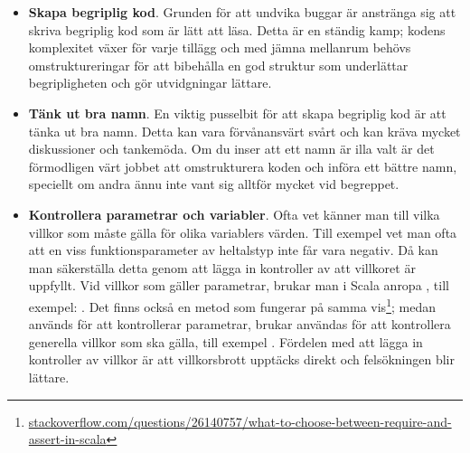 \begin{itemize}
\item \textbf{Skapa begriplig kod}. Grunden för att undvika buggar är anstränga sig att skriva begriplig kod som är lätt att läsa. Detta är en ständig kamp; kodens komplexitet växer för varje tillägg och med jämna mellanrum behövs omstruktureringar  för att bibehålla en god struktur som underlättar begripligheten och gör utvidgningar lättare. 

\item \textbf{Tänk ut bra namn}. En viktig pusselbit för att skapa begriplig kod är att tänka ut bra namn. Detta kan vara förvånansvärt svårt och kan kräva mycket diskussioner och tankemöda. 
Om du inser att ett namn är illa valt är det förmodligen värt jobbet att omstrukturera koden och införa ett bättre namn, speciellt om andra ännu inte vant sig alltför mycket vid begreppet. 

\item \textbf{Kontrollera parametrar och variabler}. Ofta vet känner man till vilka villkor som måste gälla för olika variablers värden. Till exempel vet man ofta att en viss funktionsparameter av heltalstyp inte får vara negativ. Då kan man säkerställa detta genom att lägga in kontroller av att villkoret är uppfyllt. Vid villkor som gäller parametrar, brukar man i Scala anropa , till exempel: . Det finns också en metod  som fungerar på samma vis\footnote{\href{http://stackoverflow.com/questions/26140757/what-to-choose-between-require-and-assert-in-scala}{stackoverflow.com/questions/26140757/what-to-choose-between-require-and-assert-in-scala}}; medan  används för att kontrollerar parametrar, brukar  användas för att kontrollera generella villkor som ska gälla, till exempel .  Fördelen med att lägga in kontroller av villkor är att villkorsbrott upptäcks direkt och felsökningen blir lättare. 


\end{itemize}
